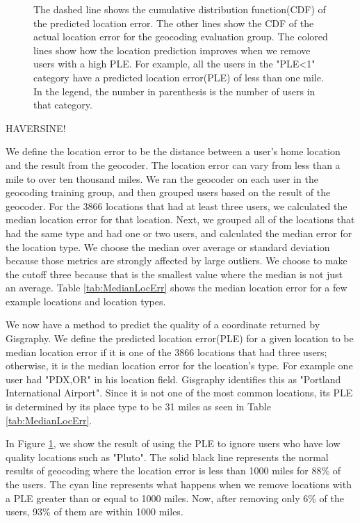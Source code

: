 \documentclass{sig-alternate}
\begin{document}
\begin{figure}
\centering
{}
\caption{
The dashed line shows the cumulative distribution function(CDF) of the predicted location error.
The other lines show the CDF of the actual location error for the geocoding evaluation group. The colored lines show how the location prediction improves when we remove users with a high PLE. For example, all the users in the "PLE<1" category have a predicted location error(PLE) of less than one mile.
In the legend, the number in parenthesis is the number of users in that category.
}
\label{fig:DiffGnpGps}
\end{figure}


\textsc{HAVERSINE!}

We define the location error to be the distance between a user's home location and the result from the geocoder.
The location error can vary from less than a mile to over ten thousand miles.
We ran the geocoder on each user in the geocoding training group, and then grouped users based on the result of the geocoder.
For the 3866 locations that had at least three users, we calculated the median location error for that location.
Next, we grouped all of the locations that had the same type and had one or two users, and calculated the median error for the location type.
We choose the median over average or standard deviation because those metrics are strongly affected by large outliers.
We choose to make the cutoff three because that is the smallest value where the median is not just an average.
Table \ref{tab:MedianLocErr} shows the median location error for a few example locations and location types.

We now have a method to predict the quality of a coordinate returned by Gisgraphy.
We define the predicted location error(PLE) for a given location to be median location error if it is one of the 3866 locations that had three users; otherwise, it is the median location error for the location's type.
For example one user had "PDX,OR" in his location field. Gisgraphy identifies this as "Portland International Airport". Since it is not one of the most common locations, its PLE is determined by its place type to be 31 miles as seen in Table \ref{tab:MedianLocErr}.

In Figure \ref{fig:DiffGnpGps}, we show the result of using the PLE to ignore users who have low quality locations such as "Pluto".
The solid black line represents the normal results of geocoding where the location error is less than 1000 miles for 88\% of the users.
The cyan line represents what happens when we remove locations with a PLE greater than or equal to 1000 miles. Now, after removing only 6\% of the users, 93\% of them are within 1000 miles.
\end{document}
